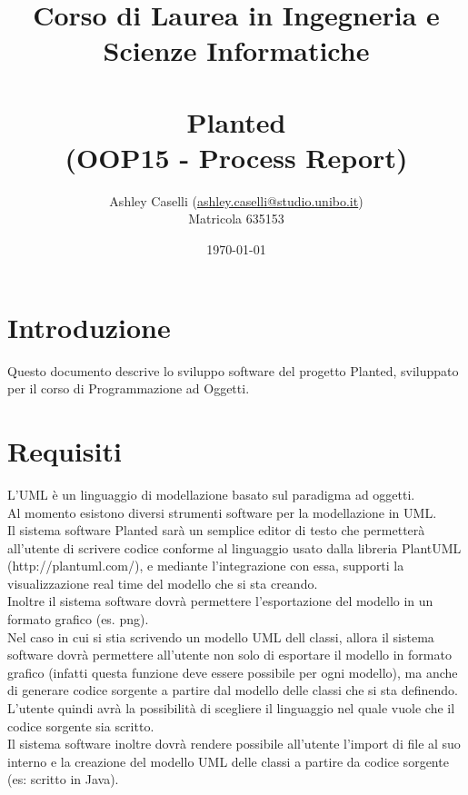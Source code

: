 \documentclass{article}
\title{Corso di Laurea in Ingegneria e Scienze Informatiche\\\textbf{\newline\\Planted}\\{(OOP15 - Process Report)}}
\date{\today}
\author{Ashley Caselli (\href{mailto:ashley.caselli@studio.unibo.it}{ashley.caselli@studio.unibo.it})\\Matricola 635153}
\begin{document}
  \maketitle
  \newpage
  \tableofcontents
  \newpage
  \section{Introduzione}
  Questo documento descrive lo sviluppo software del progetto Planted, sviluppato per il corso di Programmazione ad Oggetti.
  \section{Requisiti}
  L’UML è un linguaggio di modellazione basato sul paradigma ad oggetti.\\Al momento esistono diversi strumenti software per la modellazione in UML.\\
  Il sistema software Planted sarà un semplice editor di testo che permetterà all'utente di scrivere codice conforme al linguaggio usato
  dalla libreria PlantUML (http://plantuml.com/), e mediante l'integrazione con essa, supporti la visualizzazione real time del modello che si sta creando.\\
  Inoltre il sistema software dovrà permettere l'esportazione del modello in un formato grafico (es. png).\\
  Nel caso in cui si stia scrivendo un modello UML dell classi, allora il sistema software dovrà permettere all'utente non solo di esportare il modello
  in formato grafico (infatti questa funzione deve essere possibile per ogni modello), ma anche di generare codice sorgente a partire dal modello delle classi
  che si sta definendo. L'utente quindi avrà la possibilità di scegliere il linguaggio nel quale vuole che il codice sorgente sia scritto.\\
  Il sistema software inoltre dovrà rendere possibile all'utente l'import di file al suo interno e la creazione del modello UML delle classi a partire
  da codice sorgente (es: scritto in Java).
\end{document}
